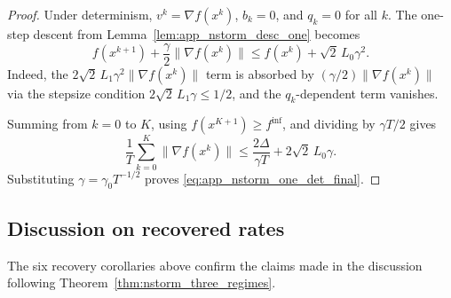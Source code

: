\documentclass[letter,11pt]{article}
\begin{document}
\begin{proof}
Under determinism, $v^k=\nabla f(x^k)$, $b_k=0$, and $q_k=0$ for all $k$.
The one-step descent from Lemma~\ref{lem:app_nstorm_desc_one} becomes
\[
    f(x^{k+1})
    + \frac{\gamma}{2}\|\nabla f(x^k)\|
    \le f(x^k)
    + \sqrt{2}\,L_0\gamma^2.
\]
Indeed, the $2\sqrt{2}\,L_1\gamma^2\|\nabla f(x^k)\|$ term is absorbed by
$(\gamma/2)\|\nabla f(x^k)\|$ via the stepsize condition
$2\sqrt{2}\,L_1\gamma \le 1/2$, and the $q_k$-dependent term vanishes.

Summing from $k=0$ to $K$, using $f(x^{K+1})\ge f^{\inf}$, and dividing by
$\gamma T/2$ gives
\[
    \frac{1}{T}\sum_{k=0}^{K}\|\nabla f(x^k)\|
    \le
    \frac{2\Delta}{\gamma T}
    + 2\sqrt{2}\,L_0\gamma.
\]
Substituting $\gamma=\gamma_0 T^{-1/2}$ proves
\eqref{eq:app_nstorm_one_det_final}.
\end{proof}

\subsection{Discussion on recovered rates}
\label{app:nstorm_recovery_discussion}

The six recovery corollaries above confirm the claims made in the discussion
following Theorem~\ref{thm:nstorm_three_regimes}.
\end{document}
